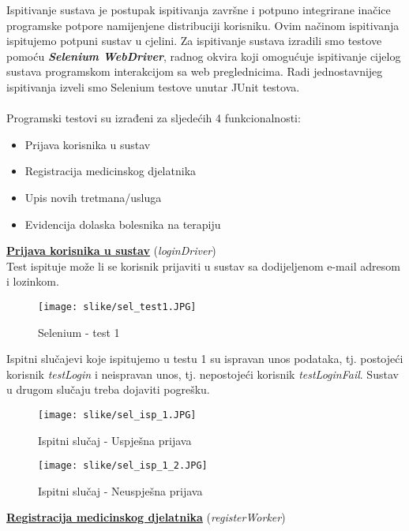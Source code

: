 			Ispitivanje sustava je postupak ispitivanja završne i potpuno integrirane inačice programske potpore namijenjene distribuciji korisniku. Ovim načinom ispitivanja ispitujemo potpuni sustav u cjelini. Za ispitivanje sustava izradili smo testove pomoću \textit{\textbf{Selenium WebDriver}}, radnog okvira koji omogućuje ispitivanje cijelog sustava programskom interakcijom sa web preglednicima. Radi jednostavnijeg ispitivanja izveli smo Selenium testove unutar JUnit testova.\\ \\
			Programski testovi su izrađeni za sljedećih 4 funkcionalnosti: 
			\begin{itemize}
				\item 	Prijava korisnika u sustav
				\item  	Registracija medicinskog djelatnika
				\item 	Upis novih tretmana/usluga 
				\item	Evidencija dolaska bolesnika na terapiju
			\end{itemize}	
			\pagebreak
			\underline{\textbf{Prijava korisnika u sustav}} (\textit{loginDriver})\\
			Test ispituje može li se korisnik prijaviti u sustav sa dodijeljenom e-mail adresom i lozinkom.			
			\begin{figure}[H]
				\texttt{[image: slike/sel\_test1.JPG]} %
				\centering
				\caption{Selenium - test 1}
				\label{fig:promjene}
			\end{figure}
			Ispitni slučajevi koje ispitujemo u testu 1 su ispravan unos podataka, tj. postojeći korisnik \textit{testLogin} i neispravan unos, tj. nepostojeći korisnik \textit{testLoginFail}. Sustav u drugom slučaju treba dojaviti pogrešku.	
			\begin{figure}[H]
				\texttt{[image: slike/sel\_isp\_1.JPG]} %
				\centering
				\caption{Ispitni slučaj - Uspješna prijava}
				\label{fig:promjene}
			\end{figure}
			\begin{figure}[H]
				\texttt{[image: slike/sel\_isp\_1\_2.JPG]} %
				\centering
				\caption{Ispitni slučaj - Neuspješna prijava}
				\label{fig:promjene}
			\end{figure}
			\pagebreak
			\underline{\textbf{Registracija medicinskog djelatnika}} (\textit{registerWorker})\\
